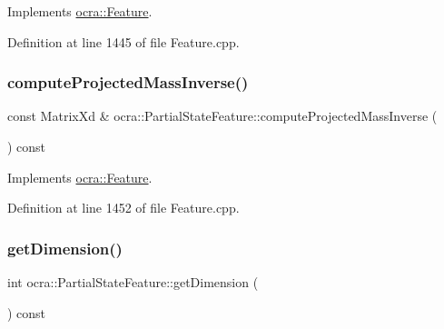 Implements \hyperlink{classocra_1_1Feature_ac529096b3fe8eba1ab88a56d8b042d37}{ocra\+::\+Feature}.



Definition at line 1445 of file Feature.\+cpp.

\hypertarget{classocra_1_1PartialStateFeature_a1e1a569e8472551e91845e585c30c4ca}{}\label{classocra_1_1PartialStateFeature_a1e1a569e8472551e91845e585c30c4ca} 
\subsubsection{\texorpdfstring{compute\+Projected\+Mass\+Inverse()}{computeProjectedMassInverse()}\hspace{0.1cm}{\footnotesize\ttfamily [2/2]}}
{\footnotesize\ttfamily const Matrix\+Xd \& ocra\+::\+Partial\+State\+Feature\+::compute\+Projected\+Mass\+Inverse (\begin{DoxyParamCaption}{ }\end{DoxyParamCaption}) const\hspace{0.3cm}{\ttfamily [virtual]}}



Implements \hyperlink{classocra_1_1Feature_ac27bcbdbb8541e3b4e2c77a6d6f2ffc0}{ocra\+::\+Feature}.



Definition at line 1452 of file Feature.\+cpp.

\hypertarget{classocra_1_1PartialStateFeature_a15b65bc093b9578fc60c04490e0dd73d}{}\label{classocra_1_1PartialStateFeature_a15b65bc093b9578fc60c04490e0dd73d} 
\subsubsection{\texorpdfstring{get\+Dimension()}{getDimension()}}
{\footnotesize\ttfamily int ocra\+::\+Partial\+State\+Feature\+::get\+Dimension (\begin{DoxyParamCaption}{ }\end{DoxyParamCaption}) const\hspace{0.3cm}{\ttfamily [virtual]}}



